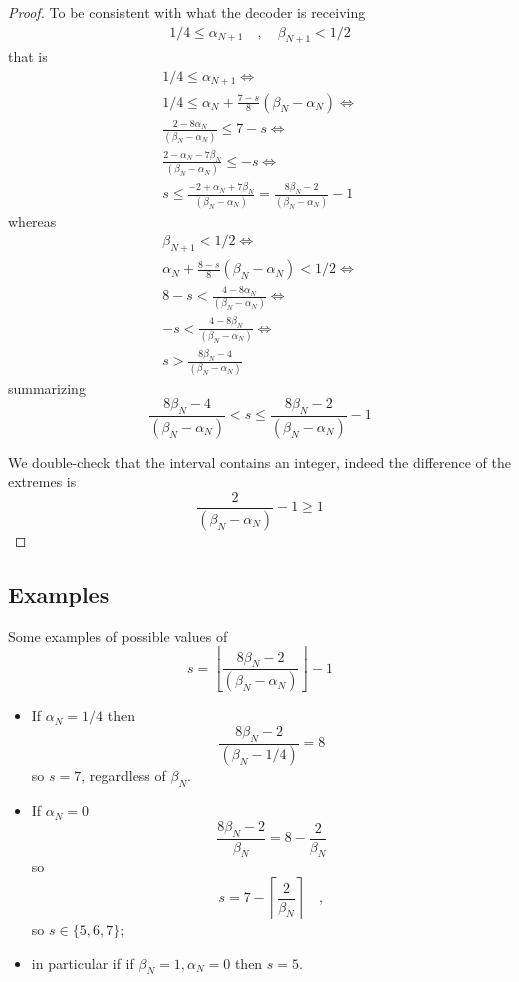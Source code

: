 \documentclass[a4paper,english]{article}
\begin{document}
\begin{proof}
To be consistent with what the decoder is receiving
\begin{align}
  1/4\le   \alpha_{N+1} \quad,\quad \beta_{N+1}< 1/2
\end{align}
that is
\begin{align*}
  1/4\le   \alpha_{N+1}
  \iff \\
  1/4\le  \alpha_N+\frac{7-s}{8}(\beta_N-\alpha_N)
  \iff \\
  \frac{2- 8 \alpha_N}{(\beta_N-\alpha_N) } \le  7-s
  \iff \\
  \frac{2-  \alpha_N - 7 \beta_N}{(\beta_N-\alpha_N) } \le  -s
  \iff \\
  s\le  \frac{-2+  \alpha_N + 7 \beta_N}{(\beta_N-\alpha_N) } =  \frac{8 \beta_N - 2}{(\beta_N-\alpha_N) } - 1
\end{align*}
whereas
\begin{align*}
  \beta_{N+1}< 1/2
  \iff \\
  \alpha_N+\frac{8-s}{8}(\beta_N-\alpha_N) < 1/2
  \iff\\
  8 -s < \frac{{4 - 8 \alpha_N}}{(\beta_N-\alpha_N)}
  \iff \\
   -s < \frac{{4 - 8 \beta_N}}{(\beta_N-\alpha_N)}
  \iff \\
   s > \frac{{8 \beta_N - 4}}{(\beta_N-\alpha_N)}
\end{align*}
summarizing
\begin{equation}
  \frac{{8 \beta_N - 4}}{(\beta_N-\alpha_N)} <  s\le  \frac{8 \beta_N - 2}{(\beta_N-\alpha_N) } - 1\label{eq:low_s_ineq}
\end{equation}

We double-check that the interval contains an integer, indeed the difference of the extremes is
\[    \frac{2}{(\beta_N-\alpha_N) } - 1 \ge  1 \]
\end{proof}


\subsection{Examples}

Some examples of
possible values of
\[s = \left\lfloor \frac{8 \beta_N - 2}{(\beta_N-\alpha_N) }\right\rfloor - 1 \]
\begin{itemize}
\item If $\alpha_N=1/4$ then
  \[ \frac{8 \beta_N - 2}{(\beta_N-1/4) } = 8\]
  so $s=7$, regardless of $\beta_N$.


\item If $\alpha_N=0$
  \[ \frac{8 \beta_N - 2}{\beta_N } = 8 - \frac{2}{\beta_N }\]
  so
  \[s = 7 - \left\lceil \frac{2}{\beta_N }\right\rceil \quad, \]
  so $s\in\{5,6,7\}$;
\item in particular if if $\beta_N=1, \alpha_N=0$ then $s=5$.
\end{itemize}
\end{document}
